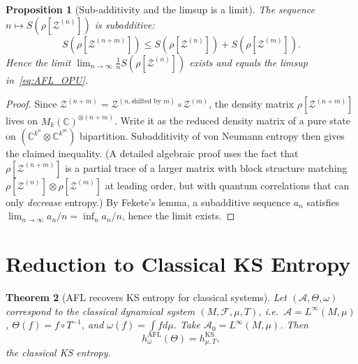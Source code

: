 \documentclass[12pt,a4paper]{article}
\newtheorem{theorem}{Theorem}[section]
\newtheorem{proposition}[theorem]{Proposition}
\newcommand{\A}{\mathcal{A}}
\begin{document}
\begin{proposition}[Sub-additivity and the limsup is a limit]
\label{prop:subaddlimit}
The sequence $n\mapsto S(\rho[\mathcal{Z}^{(n)}])$ is \emph{subadditive}:
\[
  S\!\left(\rho[\mathcal{Z}^{(n+m)}]\right)
  \leq S\!\left(\rho[\mathcal{Z}^{(n)}]\right)
    +  S\!\left(\rho[\mathcal{Z}^{(m)}]\right).
\]
Hence the limit $\lim_{n\to\infty}\frac{1}{n}S(\rho[\mathcal{Z}^{(n)}])$
exists and equals the limsup in~\eqref{eq:AFL_OPU}.
\end{proposition}
\begin{proof}
Since $\mathcal{Z}^{(n+m)}=\mathcal{Z}^{(n,\text{shifted by }m)}\circ
\mathcal{Z}^{(m)}$, the density matrix $\rho[\mathcal{Z}^{(n+m)}]$ lives on
$M_k(\mathbb{C})^{\otimes(n+m)}$.  Write it as the reduced density matrix of a
pure state on $(\mathbb{C}^{k^n}\otimes\mathbb{C}^{k^m})$ bipartition.
Subadditivity of von Neumann entropy then gives the claimed inequality.
(A detailed algebraic proof uses the fact that
$\rho[\mathcal{Z}^{(n+m)}]$ is a partial trace of a larger matrix with
block structure matching $\rho[\mathcal{Z}^{(n)}]\otimes\rho[\mathcal{Z}^{(m)}]$
at leading order, but with quantum correlations that can only \emph{decrease}
entropy.)  By Fekete's lemma, a subadditive sequence $a_n$ satisfies
$\lim_{n\to\infty}a_n/n=\inf_n a_n/n$, hence the limit exists.
\end{proof}

\section{Reduction to Classical KS Entropy}

\begin{theorem}[AFL recovers KS entropy for classical systems]
\label{thm:classAFL}
Let $(\A,\Theta,\omega)$ correspond to the classical dynamical system
$(M,\mathscr{F},\mu,T)$, i.e.\ $\A=L^\infty(M,\mu)$,
$\Theta(f)=f\circ T^{-1}$, and $\omega(f)=\int fd\mu$.  Take
$\A_0=L^\infty(M,\mu)$.  Then
\[
  h_\omega^{\mathrm{AFL}}(\Theta) = h_{\mu,T}^{\mathrm{KS}},
\]
the classical KS entropy.
\end{theorem}
\end{document}
